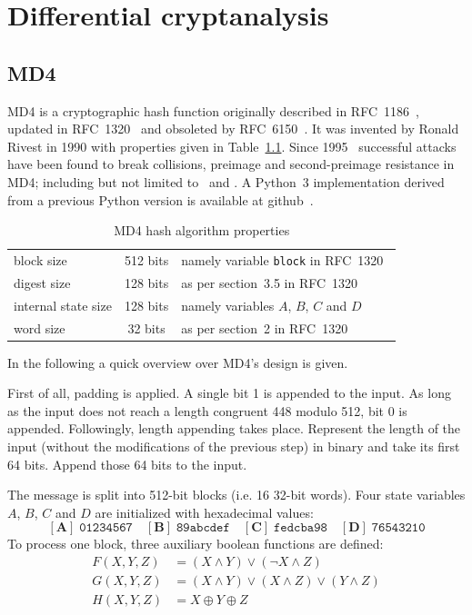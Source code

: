 \renewcommand*\chappic{img/diff-crypt.pdf}
\renewcommand*\chapquote{}
\chapter{Differential cryptanalysis}
\label{ch:dc}
%
\section{MD4}
\label{sec:dc-md4}
%
MD4 is a cryptographic hash function originally described in RFC~1186~\cite{rfc1186},
updated in RFC~1320~\cite{rfc1320} and obsoleted by RFC~6150~\cite{rfc6150}. It was
invented by Ronald Rivest in 1990 with properties given in Table~\ref{tab:md4}.
Since 1995~\cite{Dobbertin1998} successful attacks have been found to break collisions,
preimage and second-preimage resistance in MD4; including but not limited to~\cite{md4-2007} and
\cite{cryptoeprint:2005:151}. A Python~3 implementation derived from a previous Python version
is available at github~\cite{md4-py3k}.

\begin{table}[h]
  \begin{center}
    \begin{tabular}{lcl}
      block size           & 512 bits       & namely variable \texttt{block} in RFC~1320~\cite{rfc1320} \\
      digest size          & 128 bits       & as per section~3.5 in RFC~1320~\cite{rfc1320} \\
      internal state size  & 128 bits       & namely variables $A$, $B$, $C$ and $D$ \\
      word size            & 32 bits        & as per section~2 in RFC~1320~\cite{rfc1320} \\
    \end{tabular}
    \caption{MD4 hash algorithm properties}
    \label{tab:md4}
  \end{center}
\end{table}

In the following a quick overview over MD4's design is given.

First of all, padding is applied. A single bit 1 is appended to the
input. As long as the input does not reach a length congruent 448 modulo 512,
bit 0 is appended.
Followingly, length appending takes place. Represent the length of the input
(without the modifications of the previous step) in binary and take its first
64 bits. Append those 64 bits to the input.

The message is split into 512-bit blocks (i.e. 16 32-bit words).
Four state variables $A$, $B$, $C$ and $D$ are initialized with hexadecimal values:
\[
  \mathbf{[A]}\; \mathtt{01234567} \quad
  \mathbf{[B]}\; \mathtt{89abcdef} \quad
  \mathbf{[C]}\; \mathtt{fedcba98} \quad
  \mathbf{[D]}\; \mathtt{76543210}
\]
To process one block, three auxiliary boolean functions are defined:
\begin{align}
  F(X,Y,Z) &= (X \land Y) \lor (\neg X \land Z) \\
  G(X,Y,Z) &= (X \land Y) \lor (X \land Z) \lor (Y \land Z) \\
  H(X,Y,Z) &= X \oplus Y \oplus Z
\end{align}

